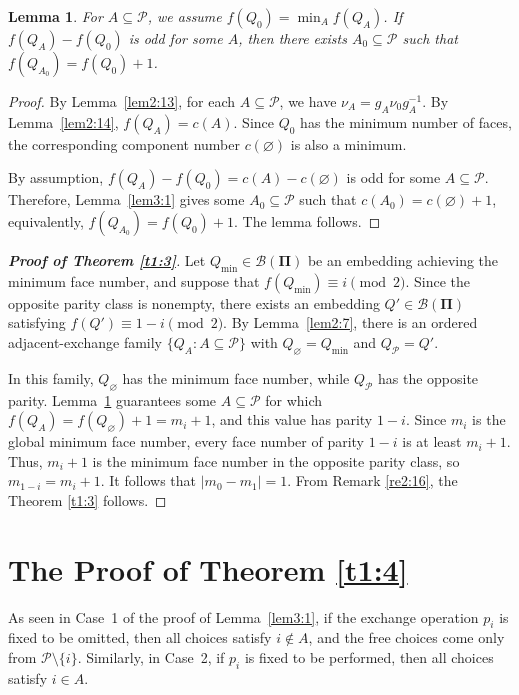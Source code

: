 \documentclass[12pt]{article}
\newtheorem{lemma}[theorem]{Lemma}
\theoremstyle{definition}
\begin{document}
\begin{lemma}
\label{lem3:2}
For $A\subseteq \mathcal P$, we assume $f(Q_0)=\min_A f(Q_A)$. If $f(Q_A)-f(Q_0)$ is odd for some $A$, then there exists $A_0\subseteq\mathcal P$ such that $f(Q_{A_0})=f(Q_0)+1$.
\end{lemma}


\begin{proof}
By Lemma~\ref{lem2:13}, for each $A\subseteq\mathcal P$, we have
$\nu_A=g_A\nu_0g_A^{-1}$. By Lemma~\ref{lem2:14},
$f(Q_A)=c(A)$. Since $Q_0$ has the minimum number of faces, the
corresponding component number $c(\varnothing)$ is also a minimum.

By assumption, $f(Q_A)-f(Q_0)=c(A)-c(\varnothing)$ is odd for some
$A\subseteq\mathcal P$. Therefore, Lemma~\ref{lem3:1} gives some
$A_0\subseteq\mathcal P$ such that
$c(A_0)=c(\varnothing)+1$, equivalently,
$f(Q_{A_0})=f(Q_0)+1$. The lemma follows.
\end{proof}

\begin{proof}[\bf{Proof of Theorem \ref{t1:3}}]
 Let $Q_{\min}\in\mathcal B(\mathbf{\Pi})$ be an embedding achieving the minimum face number, and suppose that $f(Q_{\min})\equiv i\pmod{2}$. Since the opposite parity class is nonempty, there exists an embedding $Q'\in\mathcal B(\mathbf{\Pi})$ satisfying $f(Q')\equiv 1-i\pmod{2}$. By Lemma~\ref{lem2:7}, there is an ordered adjacent-exchange family $\{Q_A:A\subseteq\mathcal P\}$ with $Q_\varnothing=Q_{\min}$ and $Q_{\mathcal P}=Q'$.

In this family, $Q_\varnothing$ has the minimum face number, while $Q_{\mathcal P}$ has the opposite parity. Lemma~\ref{lem3:2} guarantees some $A\subseteq\mathcal P$ for which $f(Q_A)=f(Q_\varnothing)+1=m_i+1$, and this value has parity $1-i$. Since $m_i$ is the global minimum face number, every face number of parity $1-i$ is at least $m_i+1$. Thus, $m_i+1$ is the minimum face number in the opposite parity class, so $m_{1-i}=m_i+1$. It follows that $|m_0-m_1|=1$. From Remark \ref{re2:16}, the Theorem \ref{t1:3} follows.
\end{proof}

\section{The Proof of Theorem \ref{t1:4}}\label{Sec:4}

 As seen in Case~1 of the proof of Lemma~\ref{lem3:1}, if the exchange operation $p_i$ is fixed to be omitted, then all choices satisfy $i\notin A$, and the free choices come only from $\mathcal P\setminus\{i\}$. Similarly, in Case~2, if $p_i$ is fixed to be performed, then all choices satisfy $i\in A$.
\end{document}
